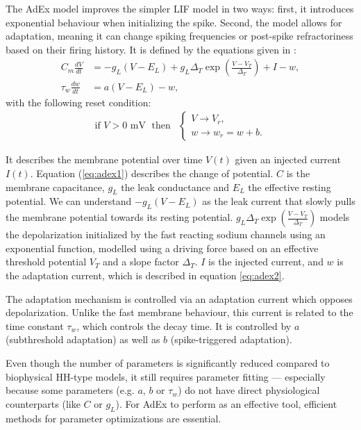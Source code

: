 The \gls{AdEx} model improves the simpler \gls{LIF} model in two ways:
first, it introduces exponential behaviour when initializing the spike.
Second, the model allows for adaptation, meaning it can change spiking frequencies or post-spike refractoriness based on their firing history.
It is defined by the equations given in \cite{Brette2005, Naud2008}:
\begin{align}
  C_m \frac{dV}{dt} &= -g_L (V - E_L) + g_L \Delta_T \exp(\frac{V - V_T}{\Delta_T}) + I - w,\label{eq:adex1}\\
  \tau_w \frac{dw}{dt} &= a(V - E_L) - w,\label{eq:adex2}
\end{align}
with the following reset condition:
\begin{align}
  \text{if } V > 0 \text{ mV}\; \text{ then} &\begin{cases}
    V \rightarrow V_r,\\
    w \rightarrow w_r = w + b.
  \end{cases}\label{eq:adex3}
\end{align}

It describes the membrane potential over time $V(t)$ given an injected current $I(t)$.
Equation (\ref{eq:adex1}) describes the change of potential.
$C$ is the membrane capacitance, $g_L$ the leak conductance and $E_L$ the effective resting potential.
We can understand $-g_L (V - E_L)$ as the leak current that slowly pulls the membrane potential towards its resting potential.
$g_L \Delta_T \exp(\frac{V - V_T}{\Delta_T})$ models the depolarization initialized by the fast reacting sodium channels using an exponential function,
modelled using a driving force based on an effective threshold potential $V_T$ and a slope factor $\Delta_T$.
$I$ is the injected current, and $w$ is the adaptation current, which is described in equation \ref{eq:adex2}.

The adaptation mechanism is controlled via an adaptation current which opposes depolarization.
Unlike the fast membrane behaviour, this current is related to the time constant $\tau_w$, which controls the decay time.
It is controlled by $a$ (subthreshold adaptation) as well as $b$ (spike-triggered adaptation).

Even though the number of parameters is significantly reduced compared to biophysical \gls{HH}-type models, it still requires parameter fitting --- especially because some parameters (e.g. $a$, $b$ or $\tau_w$) do not have direct physiological counterparts (like $C$ or $g_L$).
For \gls{AdEx} to perform as an effective tool, efficient methods for parameter optimizations are essential.

